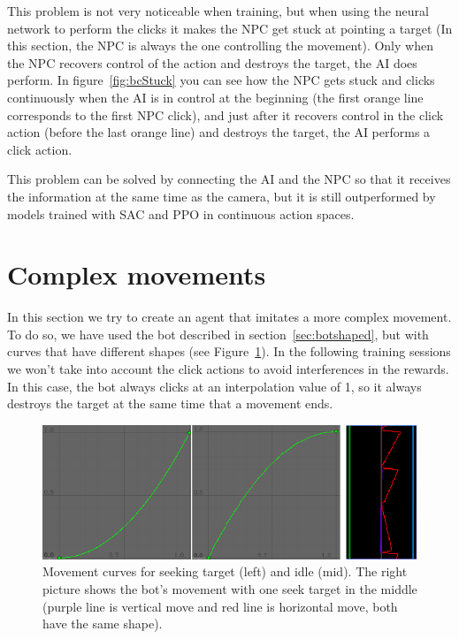 This problem is not very noticeable when training, but when using the neural network to perform the clicks it makes the NPC get stuck at pointing a target (In this section, the NPC is always the one controlling the movement). Only when the NPC recovers control of the action and destroys the target, the AI does perform. In figure~\ref{fig:bcStuck} you can see how the NPC gets stuck and clicks continuously when the AI is in control at the beginning (the first orange line corresponds to the first NPC click), and just after it recovers control in the click action (before the last orange line) and destroys the target, the AI performs a click action.

This problem can be solved by connecting the AI and the NPC so that it receives the information at the same time as the camera, but it is still outperformed by models trained with SAC and PPO in continuous action spaces.

\section{Complex movements}

In this section we try to create an agent that imitates a more complex movement. To do so, we have used the bot described in section~\ref{sec:botshaped}, but with curves that have different shapes (see Figure~\ref{fig:compCurve}). In the following training sessions we won't take into account the click actions to avoid interferences in the rewards. In this case, the bot always clicks at an interpolation value of 1, so it always destroys the target at the same time that a movement ends.

\begin{figure}[h]
  \centering
		\includegraphics[width=.8\textwidth]{img/gphCompActions.png}
  \caption{Movement curves for seeking target (left) and idle (mid). The right picture shows the bot's movement with one seek target in the middle (purple line is vertical move and red line is horizontal move, both have the same shape).}
  \label{fig:compCurve}
\end{figure}

